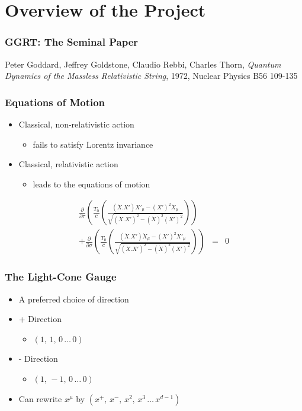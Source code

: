 \documentclass{beamer}
\begin{document}
\section{Overview of the Project}

\begin{frame}
\frametitle{GGRT: The Seminal Paper}
Peter Goddard, Jeffrey Goldstone, Claudio Rebbi, Charles Thorn, \emph{Quantum Dynamics of the Massless Relativistic String}, 1972, Nuclear Physics B56 109-135
\end{frame}

\begin{frame}
\frametitle{Equations of Motion}
\begin{itemize}
\item{Classical, non-relativistic action}
\begin{itemize}
\item {fails to satisfy Lorentz invariance}
\end{itemize}
\item{Classical, relativistic action}
\begin{itemize}
\item{leads to the equations of motion}
\end{itemize}
\end{itemize}
\begin{eqnarray*}
\frac{\partial}{\partial \tau}\left( \frac{T_0}{c}\left( \frac{(\dot{X}.X')X'_\mu - (X')^2\dot{X}_\mu}{\sqrt{(\dot{X}.X')^2 - (\dot{X})^2(X')^2}}\right)\right)&&\\ + \frac{\partial}{\partial \sigma}\left(\frac{T_0}{c}\left( \frac{(\dot{X}.X')\dot{X}_\mu - (X')^2X'_\mu}{\sqrt{(\dot{X}.X')^2 - (\dot{X})^2(X')^2}}\right)\right) &=& 0
\end{eqnarray*}
\end{frame}


\begin{frame}
\frametitle{The Light-Cone Gauge}
\begin{itemize}
\item{A preferred choice of direction}
\item{+ Direction}
\begin{itemize}
\item{$(1,\, 1,\, 0\, \dots\, 0)$}
\end{itemize}
\item{- Direction}
\begin{itemize}
\item{  $(1,\, -1,\, 0\, \dots\, 0)$}
\end{itemize}
\item{Can rewrite $x^\mu$ by $(x^+,\, x^-,\, x^2,\, x^3\,\dots\,x^{d-1})$}
\end{itemize}
\end{frame}
\end{document}
